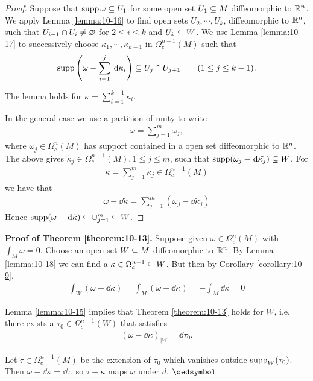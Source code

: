 \begin{proof}
  Suppose that $\operatorname{supp}\omega\subseteq U_1$ for some open set $U_1\subseteq M$ diffeomorphic to 
  $\mathbb{R}^n$. We apply Lemma \ref{lemma:10-16} to find open sets $U_2, \cdots, U_k$, diffeomorphic 
  to $\mathbb{R}^n$, such that $U_{i-1}\cap U_i\neq \varnothing$ for $2\le i\le k$ and $U_k\subseteq W$. We use Lemma 
  \ref{lemma:10-17} to successively choose $\kappa_1, \cdots, \kappa_{k-1}$ in $\Omega^{n-1}_c(M)$ such that 
  \begin{align*}
    \supp\left(\omega - \sum_{i=1}^{j }{\dd\kappa_i }\right)
    \sseq U_j\cap U_{j+1}\qquad (1\le j\le k-1).
  \end{align*}

  The lemma holds for $\kappa = \sum_{i=1}^{k-1}{\kappa_i}$.

  In the general case we use a partition of unity to write
  \begin{align*}
    \omega = \sum_{j = 1}^{m }{\omega_j},
  \end{align*}
  where $\omega_j\in\Omega^n_c(M)$ has support contained in a open set diffeomorphic to $\mathbb{R}^n$. 
  The above gives $\tilde{\kappa}_j\in\Omega^{n-1}_c(M), 1\le j\le m$, such that $\supp(\omega_j-\dd\tilde{\kappa_j})\sseq W$.
  For 
  \begin{align*}
    \tilde{\kappa} = \sum_{j=1}^{m }{\tilde{\kappa}_j} \in \Omega^{n-1}_c(M)
  \end{align*}
  we have that
  \begin{align*}
    \omega -\dd\tilde{\kappa} = \sum_{j=1}^{m }{(\omega_j - \dd\tilde{\kappa}_j)}
  \end{align*}
  Hence $\supp(\omega-\dd\tilde{\kappa})\sseq \cup_{j=1}^m\sseq W$.
\end{proof}

\textbf{Proof of Theorem \ref{theorem:10-13}.} Suppose given $\omega\in\Omega^n_c(M)$ with 
$\int_M\omega = 0$. Choose an open set $W\subseteq M$ diffeomorphic to $\mathbb{R}^n$. By Lemma \ref{lemma:10-18}
we can find a $\kappa\in\Omega_c^{n-1}\subseteq W$. But then by Corollary \ref{corollary:10-9},
\begin{align*}
  \int_W (\omega - \dd\kappa) 
  = \int_M (\omega - \dd\kappa)
  = - \int_M\dd\kappa 
  = 0
\end{align*}

Lemma \ref{lemma:10-15} implies that Theorem \ref{theorem:10-13} holds for $W$, i.e. there 
exists a $\tau_0\in\Omega^{n-1}_c(W)$ that satisfies
\begin{align*}
  (\omega - \dd\kappa)_{|W} = \dd\tau_0.
\end{align*}

Let $\tau\in \Omega^{n-1}_c(M)$ be the extension of $\tau_0$ which vanishes outside $\operatorname{supp}_W(\tau_0)$.
Then $\omega -\dd\kappa=\dd\tau$, so $\tau+\kappa$ maps $\omega$ under $d$. \hfill\(\qedsymbol\)